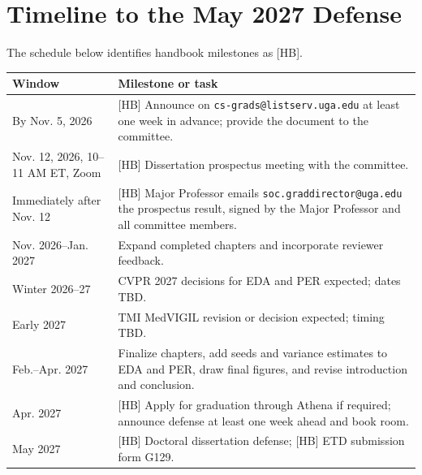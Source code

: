 \section{Timeline to the May 2027 Defense}\label{sec:timeline}
The schedule below identifies handbook milestones as [HB].
\begin{longtable}{p{}p{}}\toprule
Window & Milestone or task \\\midrule\endhead
By Nov. 5, 2026 & [HB] Announce on \texttt{cs-grads@listserv.uga.edu} at least one week in advance; provide the document to the committee. \\
Nov. 12, 2026, 10--11 AM ET, Zoom & [HB] Dissertation prospectus meeting with the committee. \\
Immediately after Nov. 12 & [HB] Major Professor emails \texttt{soc.graddirector@uga.edu} the prospectus result, signed by the Major Professor and all committee members. \\
Nov. 2026--Jan. 2027 & Expand completed chapters and incorporate reviewer feedback. \\
Winter 2026--27 & CVPR 2027 decisions for EDA and PER expected; dates TBD. \\
Early 2027 & TMI MedVIGIL revision or decision expected; timing TBD. \\
Feb.--Apr. 2027 & Finalize chapters, add seeds and variance estimates to EDA and PER, draw final figures, and revise introduction and conclusion. \\
Apr. 2027 & [HB] Apply for graduation through Athena if required; announce defense at least one week ahead and book room. \\
May 2027 & [HB] Doctoral dissertation defense; [HB] ETD submission form G129. \\\bottomrule
\end{longtable}

